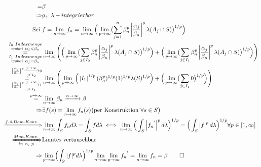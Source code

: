 \documentclass[12pt,a4paper]{article}
\DeclareMathOperator*{\equals}{=}
\begin{document}
\begin{align*}
	=&\beta\\
	\Rightarrow &{g_+} \ \lambda -integrierbar\\
	\text{Sei } & f=\lim_{n \to\infty} f_n = \lim_{n \to \infty}\Big(\lim_{p \to\infty} \bigl(\sum_{j=1}^{n}\beta_n^p\left\lvert\frac{\alpha_{j}}{\beta_n}\right\lvert^{p}\lambda(A_j \cap S)\bigr)^{1/p}\Big)\\
	\equals_{\substack{I_1 \  Indexmenge \\ wobei \ \alpha_j = \beta_n}}^{\substack{I_0 \  Indexmenge \\ wobei \ \alpha_j < \beta_n}}& \lim_{n \to \infty}\Bigg(\Big(\lim_{p \to\infty} \bigl(\sum_{j \in I_0}\beta_n^p\left\lvert\frac{\alpha_{j}}{\beta_n}\right\lvert^{p}\lambda(A_j \cap S)\bigr)^{1/p}\Big)+ \Big(\lim_{p \to\infty} \bigl(\sum_{j \in I_1}\beta_n^p\left\lvert\frac{\alpha_{j}}{\beta_n}\right\lvert^{p}\lambda(A_j \cap S)\bigr)^{1/p}\Big)\Bigg)\\
	\equals_{\left\lvert\frac{\alpha_{j}}{\beta_n}\right\lvert^{p} \xrightarrow[j \in I_1]{p\to\infty}1}^{\left\lvert\frac{\alpha_{j}}{\beta_n}\right\lvert^{p} \xrightarrow[j \in I_0]{p\to\infty}0}& \lim_{n \to \infty}\Bigg(\lim_{p \to\infty} \Big(\left\lvert I_1\right\lvert^{1/p}(\beta_n^p)^{1/p}(1)^{1/p}\lambda(S)^{1/p}\Big)+ \Big(\lim_{p \to\infty} \bigl(\sum_{j \in I_1}0\bigr)^{1/p}\Big)\Bigg)\\
	\equals^{p\to\infty} & \lim_{n\to\infty} \beta_n \xrightarrow{n\to\infty} \beta\\
	\Rightarrow & \exists f(s) = \lim_{n\to\infty}f_n(s) \big( \text{per Konstruktion } \forall s \in S\big)\\
	\xRightarrow{f.\emph{ü}. Dom. Konv.} & \lim_{n\to\infty}\int_Sf_n d\lambda = \int_Sf d\lambda\iff \lim_{n\to\infty}\Big(\int_S\left\lvert {f_n}^{'} \right\lvert^{p}d\lambda\Big)^{1/p} = \Big(\int_S\left\lvert f\right\lvert^{p}d\lambda\Big)^{1/p} \forall p \in [1,\infty]\\
	\xRightarrow[in \ n,\ p]{Mon. Konv.} &\text{Limites vertauschbar}\\
	\Rightarrow &\lim_{p\to\infty}\Bigl( \int_{S}|f|^p d\lambda \Bigr)^{1/p} \lim_{n\to\infty}\lim_{p\to\infty}{f_n}^{'}= \lim_{n\to\infty}f_n = \beta \qed\\
	\end{align*}
\end{document}
